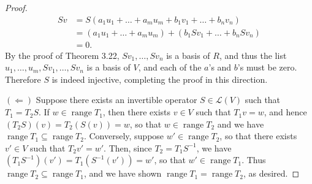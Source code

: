 \documentclass[11pt]{extarticle}
\newcommand{\Hom}{\mathcal{L}}
\DeclareMathOperator{\Range}{range}
\begin{document}
\begin{proof}
\begin{align*}
Sv &= S(a_1u_1 + \dots + a_mu_m + b_1v_1 + \dots + b_nv_n)\\
&= (a_1u_1 + \dots + a_mu_m) + (b_1Sv_1 + \dots + b_nSv_n)\\
&= 0.
\end{align*}
By the proof of Theorem 3.22, $Sv_1,\dots, Sv_n$ is a basis of $R$, and thus the list $u_1,\dots, u_m, Sv_1,\dots, Sv_n$ is a basis of $V$, and each of the $a$'s and $b$'s must be zero.  Therefore $S$ is indeed injective, completing the proof in this direction.
\par $(\Leftarrow)$ Suppose there exists an invertible operator $S\in\Hom(V)$ such that $T_1 = T_2S$.  If $w\in\Range T_1$, then there exists $v\in V$ such that $T_1v = w$, and hence $(T_2S)(v) = T_2(S(v)) = w$, so that $w\in\Range T_2$ and we have $\Range T_1\subseteq \Range T_2$.  Conversely, suppose $w'\in\Range T_2$, so that there exists $v'\in V$ such that $T_2v' = w'$.  Then, since $T_2 = T_1S^{-1}$, we have $(T_1S^{-1})(v') = T_1(S^{-1}(v')) = w'$, so that $w'\in\Range T_1$.  Thus $\Range T_2\subseteq\Range T_1$, and we have shown $\Range T_1 = \Range T_2$, as desired.
\end{proof}
\end{document}
